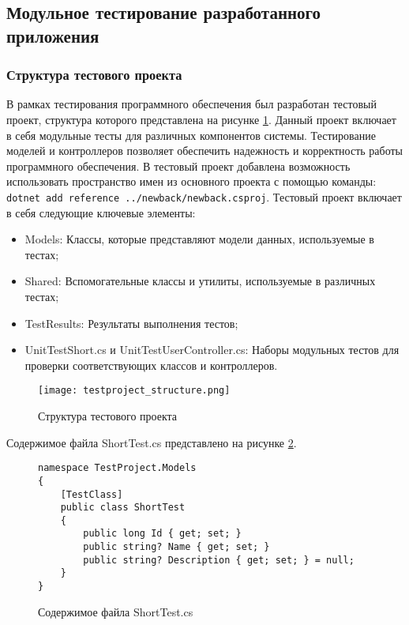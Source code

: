 \renewcommand{\arraystretch}{1.0} %

\subsection{Модульное тестирование разработанного приложения}


\subsubsection{Структура тестового проекта}
В рамках тестирования программного обеспечения был разработан тестовый проект, структура которого представлена на рисунке \ref{testproject_structure:image}. Данный проект включает в себя модульные тесты для различных компонентов системы. Тестирование моделей и контроллеров позволяет обеспечить надежность и корректность работы программного обеспечения.
В тестовый проект добавлена возможность использовать пространство имен из основного проекта с помощью команды: \texttt{dotnet add reference ../new\textunderscore back/new\textunderscore back.csproj}.
Тестовый проект включает в себя следующие ключевые элементы:

\begin{itemize}
  \item Models: Классы, которые представляют модели данных, используемые в тестах;
  \item Shared: Вспомогательные классы и утилиты, используемые в различных тестах;
  \item TestResults: Результаты выполнения тестов;
  \item UnitTestShort.cs и UnitTestUserController.cs: Наборы модульных тестов для проверки соответствующих классов и контроллеров.
\end{itemize}

\begin{figure}[ht]
\centering
\texttt{[image: testproject\_structure.png]}
\caption{Структура тестового проекта}
\label{testproject_structure:image}
\end{figure}

Содержимое файла ShortTest.cs представлено на рисунке \ref{st:image}.

\begin{figure}[!ht]
\lstset{style=sharpc}
\begin{lstlisting}
namespace TestProject.Models
{
    [TestClass]
    public class ShortTest
    {
        public long Id { get; set; }
        public string? Name { get; set; }
        public string? Description { get; set; } = null;
    }
}
\end{lstlisting}
\caption{Содержимое файла ShortTest.cs}
\label{st:image}
\end{figure}

